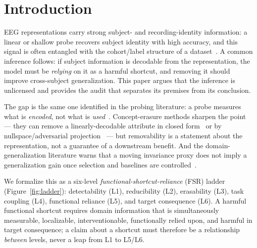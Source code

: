\section{Introduction}
\label{sec:intro}

EEG representations carry strong subject- and recording-identity information: a linear or shallow
probe recovers subject identity with high accuracy, and this signal is often entangled with the
cohort/label structure of a dataset~\citep{lin2026identitytrap}. A common inference follows: if subject
information is decodable from the representation, the model must be \emph{relying} on it as a harmful
shortcut, and removing it should improve cross-subject generalization. This paper argues that the
inference is unlicensed and provides the audit that separates its premises from its conclusion.

The gap is the same one identified in the probing literature: a probe measures what is
\emph{encoded}, not what is \emph{used}~\citep{elazar2021amnesic}. Concept-erasure methods sharpen
the point --- they can remove a linearly-decodable attribute in closed form~\citep{belrose2023leace}
or by nullspace/adversarial projection~\citep{ravfogel2020inlp,ravfogel2022rlace} --- but removability
is a statement about the representation, not a guarantee of a downstream benefit. And the domain-
generalization literature warns that a moving invariance proxy does not imply a generalization gain
once selection and baselines are controlled~\citep{gulrajani2021domainbed}.

We formalize this as a six-level \emph{functional-shortcut-reliance} (FSR) ladder
(Figure~\ref{fig:ladder}): detectability (L1), reducibility (L2), erasability (L3), task coupling
(L4), functional reliance (L5), and target consequence (L6). A harmful functional shortcut requires
domain information that is simultaneously measurable, localizable, interventionable, functionally
relied upon, and harmful in target consequence; a claim about a shortcut must therefore be a
relationship \emph{between} levels, never a leap from L1 to L5/L6.

